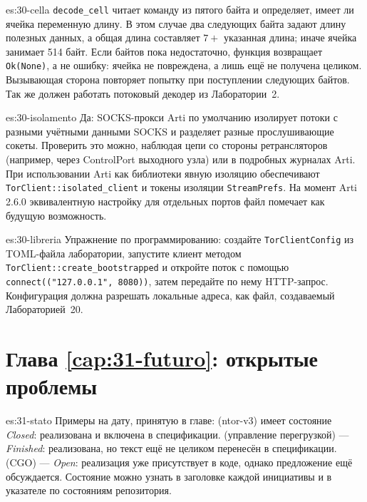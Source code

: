 \begin{soluzione}{es:30-cella}
\texttt{decode\_cell} читает команду из пятого байта и определяет, имеет ли ячейка переменную длину. В этом случае два следующих байта задают длину полезных данных, а общая длина составляет $7 +$ указанная длина; иначе ячейка занимает 514 байт. Если байтов пока недостаточно, функция возвращает \texttt{Ok(None)}, а не ошибку: ячейка не повреждена, а лишь ещё не получена целиком. Вызывающая сторона повторяет попытку при поступлении следующих байтов. Так же должен работать потоковый декодер из Лаборатории~2.
\end{soluzione}

\begin{soluzione}{es:30-isolamento}
Да: SOCKS-прокси Arti по умолчанию изолирует потоки с разными учётными данными SOCKS и разделяет разные прослушивающие сокеты. Проверить это можно, наблюдая цепи со стороны ретрансляторов (например, через ControlPort выходного узла) или в подробных журналах Arti. При использовании Arti как библиотеки явную изоляцию обеспечивают \texttt{TorClient::isolated\_client} и токены изоляции \texttt{StreamPrefs}. На момент Arti 2.6.0 эквивалентную настройку для отдельных портов файл  помечает как будущую возможность.
\end{soluzione}

\begin{soluzione}{es:30-libreria}
Упражнение по программированию: создайте \texttt{TorClientConfig} из TOML-файла лаборатории, запустите клиент методом \texttt{TorClient::create\_bootstrapped} и откройте поток с помощью \texttt{connect(("127.0.0.1", 8080))}, затем передайте по нему HTTP-запрос. Конфигурация должна разрешать локальные адреса, как файл, создаваемый Лабораторией~20.
\end{soluzione}

\section*{Глава \ref{cap:31-futuro}: открытые проблемы}

\begin{soluzione}{es:31-stato}
Примеры на дату, принятую в главе:  (ntor-v3) имеет состояние \emph{Closed}: реализована и включена в спецификации.  (управление перегрузкой) — \emph{Finished}: реализована, но текст ещё не целиком перенесён в спецификации.  (CGO) — \emph{Open}: реализация уже присутствует в коде, однако предложение ещё обсуждается. Состояние можно узнать в заголовке каждой инициативы и в указателе по состояниям репозитория.
\end{soluzione}

